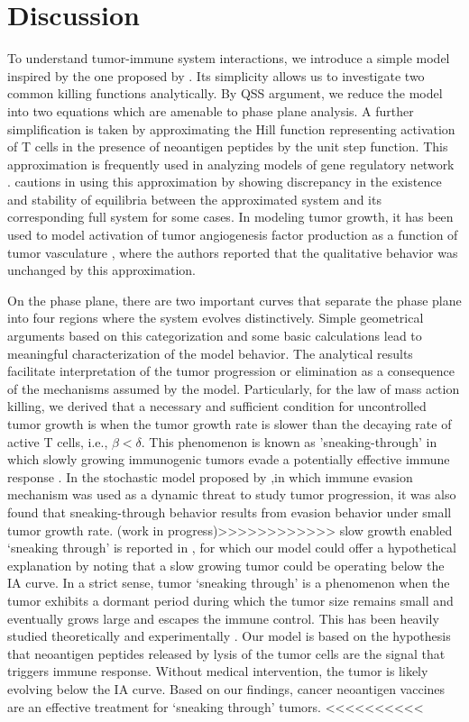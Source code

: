 \documentclass[review,authoryear]{elsarticle}
\begin{document}
\section{Discussion\label{sec:Discussion}}
To understand tumor-immune system interactions, we introduce a simple model inspired by the one proposed by \citet{Messan2021}. Its simplicity allows us to investigate two common killing functions analytically. By QSS argument,
we reduce the model into two equations which are amenable to phase
plane analysis. A further simplification is taken by approximating the
Hill function representing activation of T cells in the presence of neoantigen
peptides by the unit step function. This approximation
is frequently used in analyzing models of gene regulatory network
 \citep[e.g.,][]{Glass1973,Mestl1995}. \citet{Polynikis2009} cautions in using this approximation by showing discrepancy in the existence and stability of equilibria between the approximated system and its corresponding full system for some cases. In modeling
tumor growth, it has been used to model activation of tumor angiogenesis
factor production as a function of tumor vasculature \citep{Stamper2007},
where the authors reported that the qualitative behavior was unchanged
by this approximation.

On the phase plane, there are two important curves that separate the phase plane into four regions where the system evolves distinctively. Simple
geometrical arguments based on this categorization and some basic
calculations lead to meaningful characterization of the model behavior.
The analytical results facilitate interpretation of the tumor
progression or elimination as a consequence of the mechanisms assumed by the model.
Particularly, for the law of mass action killing, we derived
that a necessary and sufficient condition
for uncontrolled tumor growth is when the tumor growth rate is slower than the
decaying rate of active T cells, i.e., $\beta<\delta$. This phenomenon is known as 'sneaking-through' in which slowly growing immunogenic tumors evade a potentially effective immune response \citet{bocharov2004underwhelming}. In the stochastic model proposed by \cite{George2018},in which immune evasion mechanism was used as a dynamic threat to study tumor progression, it was also found that sneaking-through behavior results from evasion behavior under small tumor growth rate.
(work in progress)>>>>>>>>>>>>
slow growth enabled `sneaking through' is reported in , for which our model could offer a hypothetical explanation by noting that a slow growing tumor could be operating below the IA curve. In a strict sense, tumor `sneaking through' is a phenomenon when the tumor exhibits a dormant period during which the tumor size remains small and eventually grows large and escapes the immune control. This has been heavily studied theoretically
and experimentally \citep[see e.g.][for a review]{Wilkie2013}. 
 Our model is based on the hypothesis that neoantigen peptides released by lysis of the tumor cells are the signal that triggers immune response. Without medical intervention, the tumor is likely evolving below the IA curve. Based on our findings, cancer neoantigen vaccines are an effective treatment for `sneaking through' tumors.   
<<<<<<<<<<
\end{document}
